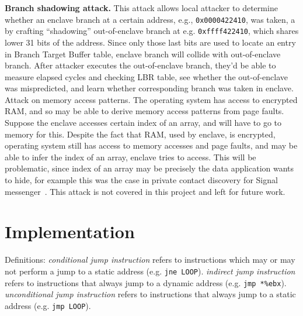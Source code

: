\documentclass[sigplan, review]{acmart}
\begin{document}
\textbf{Branch shadowing attack.}\cite{lee2016inferring} This attack allows local attacker to determine whether an enclave branch at a certain address, e.g., \texttt{0x0000422410}, was taken, a by crafting “shadowing” out-of-enclave branch at e.g. \texttt{0xffff422410}, which shares lower 31 bits of the address. Since only those last bits are used to locate an entry in Branch Target Buffer table, enclave branch will collide with out-of-enclave branch. After attacker executes the out-of-enclave branch, they’d be able to measure elapsed cycles and checking LBR table, see whether the out-of-enclave was mispredicted, and learn whether corresponding branch was taken in enclave.
Attack on memory access patterns. The operating system has access to encrypted RAM, and so may be able to derive memory access patterns from page faults. Suppose the enclave accesses certain index of an array, and will have to go to memory for this. Despite the fact that RAM, used by enclave, is encrypted, operating system still has access to memory accesses and page faults, and may be able to infer the index of an array, enclave tries to access. This will be problematic, since index of an array may be precisely the data application wants to hide, for example this was the case in private contact discovery for Signal messenger~\cite{signalprivaterecovery}. This attack is not covered in this project and left for future work.

\section{Implementation}
Definitions: \textit{conditional jump instruction} refers to instructions which may or may not perform a jump to a static address (e.g. \texttt{jne LOOP}). \textit{indirect jump instruction} refers to instructions that always jump to a dynamic address (e.g. \texttt{jmp *\%ebx}). \textit{unconditional jump instruction} refers to instructions that always jump to a static address (e.g. \texttt{jmp LOOP}).
\end{document}
